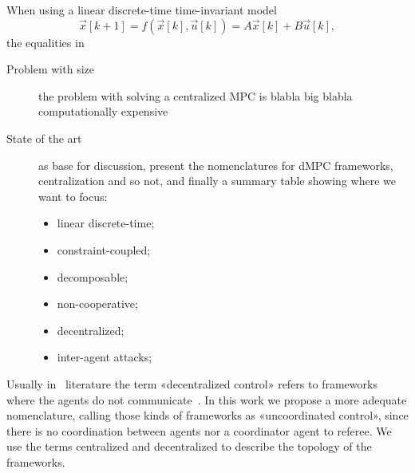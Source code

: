 \documentclass[../main.tex]{subfiles}
\begin{document}
When using a linear discrete-time time-invariant model
\begin{equation}
  \vec{x}[k+1]=f(\vec{x}[k],\vec{u}[k])=A\vec{x}[k]+B\vec{u}[k],
\end{equation}
the equalities in


\begin{description}
  \item[Problem with size] the problem with solving a centralized MPC is blabla big blabla computationally expensive
  \item[State of the art] \cite{ChristofidesEtAl2013,ArauzEtAl2021,NotarnicolaNotarstefano2020, MaestreEtAl2014} as base for discussion,
        present the nomenclatures for dMPC frameworks, centralization and so not, and finally a summary table showing where we want to focus:
        \begin{itemize}
          \item linear discrete-time;
          \item constraint-coupled;
          \item decomposable;
          \item non-cooperative;
          \item decentralized;
          \item inter-agent attacks;
        \end{itemize}
\end{description}

\begin{remark}
  Usually in \dmpc\ literature the term «decentralized control» refers to frameworks where the agents do not communicate~\cite[\S 4]{ChristofidesEtAl2013}. In this work we propose a more adequate nomenclature, calling those kinds of frameworks as «uncoordinated control», since there is no coordination between agents nor a coordinator agent to referee. We use the terms centralized and decentralized to describe the topology of the frameworks.
\end{remark}
\end{document}

